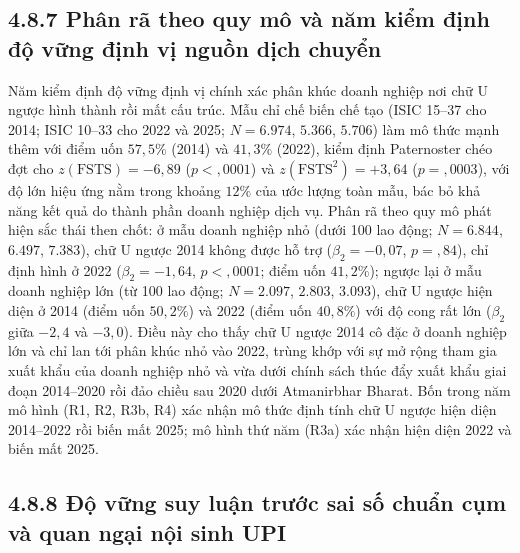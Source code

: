 \documentclass[
  a4paper,
  13pt]{extreport}
\begin{document}
\hypertarget{phuxe2n-ruxe3-theo-quy-muxf4-vuxe0-nux103m-kiux1ec3m-ux111ux1ecbnh-ux111ux1ed9-vux1eefng-ux111ux1ecbnh-vux1ecb-nguux1ed3n-dux1ecbch-chuyux1ec3n}{%
\subsection{4.8.7 Phân rã theo quy mô và năm kiểm định độ vững định vị
nguồn dịch
chuyển}\label{phuxe2n-ruxe3-theo-quy-muxf4-vuxe0-nux103m-kiux1ec3m-ux111ux1ecbnh-ux111ux1ed9-vux1eefng-ux111ux1ecbnh-vux1ecb-nguux1ed3n-dux1ecbch-chuyux1ec3n}}

Năm kiểm định độ vững định vị chính xác phân khúc doanh nghiệp nơi chữ U
ngược hình thành rồi mất cấu trúc. Mẫu chỉ chế biến chế tạo (ISIC 15--37
cho 2014; ISIC 10--33 cho 2022 và 2025; \(N = 6.974\), \(5.366\),
\(5.706\)) làm mô thức mạnh thêm với điểm uốn \(57{,}5\%\) (2014) và
\(41{,}3\%\) (2022), kiểm định Paternoster chéo đợt cho
\(z(\mathrm{FSTS}) = -6{,}89\) (\(p < {,}0001\)) và
\(z(\mathrm{FSTS}^2) = +3{,}64\) (\(p = {,}0003\)), với độ lớn hiệu ứng
nằm trong khoảng \(12\%\) của ước lượng toàn mẫu, bác bỏ khả năng kết
quả do thành phần doanh nghiệp dịch vụ. Phân rã theo quy mô phát hiện
sắc thái then chốt: ở mẫu doanh nghiệp nhỏ (dưới 100 lao động;
\(N = 6.844\), \(6.497\), \(7.383\)), chữ U ngược 2014 không được hỗ trợ
(\(\beta_2 = -0{,}07\), \(p = {,}84\)), chỉ định hình ở 2022
(\(\beta_2 = -1{,}64\), \(p < {,}0001\); điểm uốn \(41{,}2\%\)); ngược
lại ở mẫu doanh nghiệp lớn (từ 100 lao động; \(N = 2.097\), \(2.803\),
\(3.093\)), chữ U ngược hiện diện ở 2014 (điểm uốn \(50{,}2\%\)) và 2022
(điểm uốn \(40{,}8\%\)) với độ cong rất lớn (\(\beta_2\) giữa \(-2{,}4\)
và \(-3{,}0\)). Điều này cho thấy chữ U ngược 2014 cô đặc ở doanh nghiệp
lớn và chỉ lan tới phân khúc nhỏ vào 2022, trùng khớp với sự mở rộng
tham gia xuất khẩu của doanh nghiệp nhỏ và vừa dưới chính sách thúc đẩy
xuất khẩu giai đoạn 2014--2020 rồi đảo chiều sau 2020 dưới Atmanirbhar
Bharat. Bốn trong năm mô hình (R1, R2, R3b, R4) xác nhận mô thức định
tính chữ U ngược hiện diện 2014--2022 rồi biến mất 2025; mô hình thứ năm
(R3a) xác nhận hiện diện 2022 và biến mất 2025.

\hypertarget{ux111ux1ed9-vux1eefng-suy-luux1eadn-trux1b0ux1edbc-sai-sux1ed1-chuux1ea9n-cux1ee5m-vuxe0-quan-ngux1ea1i-nux1ed9i-sinh-upi}{%
\subsection{4.8.8 Độ vững suy luận trước sai số chuẩn cụm và quan ngại
nội sinh
UPI}\label{ux111ux1ed9-vux1eefng-suy-luux1eadn-trux1b0ux1edbc-sai-sux1ed1-chuux1ea9n-cux1ee5m-vuxe0-quan-ngux1ea1i-nux1ed9i-sinh-upi}}
\end{document}
